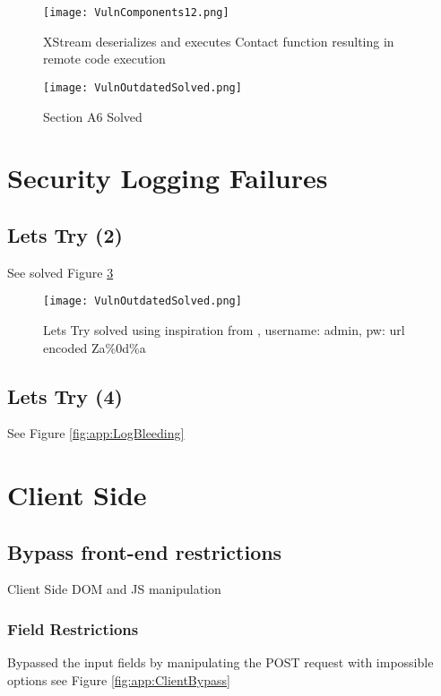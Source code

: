 \documentclass[
	letterpaper, %
	10pt, %
	unnumberedsections, %
	twoside, %
]{APAAssignment}
\begin{document}
\begin{appendices}
\begin{figure}[!ht] %
	\centering
	\texttt{[image: VulnComponents12.png]}
	\caption{XStream deserializes and executes Contact function resulting in remote code execution}
	\label{fig:app:vuln12}
\end{figure}


\begin{figure}[!ht] %
	\centering
	\texttt{[image: VulnOutdatedSolved.png]}
	\caption{Section A6 Solved}
	\label{fig:app:vulnSolved}
\end{figure}

\section{Security Logging Failures}\label{app:SecurityLogging}
\subsection{Lets Try (2)}
See solved Figure \ref{fig:app:LetsTry}

\begin{figure}[!htp] %
	\centering
	\texttt{[image: VulnOutdatedSolved.png]}
	\caption{Lets Try solved using inspiration from \cite{CycubicsDocsWebGoat}, username: admin, pw: url encoded Za\%0d\%a}
	\label{fig:app:LetsTry}
\end{figure}

\subsection{Lets Try (4)}
See Figure \ref{fig:app:LogBleeding}


\section{Client Side}\label{app:ClientSide}

\subsection{Bypass front-end restrictions}
Client Side DOM and JS manipulation

\subsubsection{Field Restrictions}
Bypassed the input fields by manipulating the POST request with impossible options see Figure \ref{fig:app:ClientBypass} 


\end{appendices}
\end{document}
